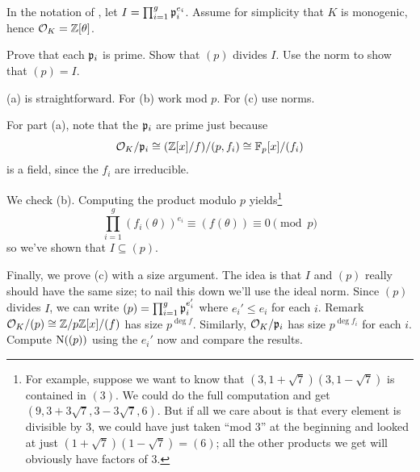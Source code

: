 \begin{problem}
	\label{prob:prove_factoring_algorithm}
	In the notation of , let $I = \prod_{i=1}^g \mathfrak p_i^{e_i}$.
	Assume for simplicity that $K$ is monogenic, hence $\mathcal O_K = \mathbb Z[\theta]$.
	\begin{enumerate}[(a)]
		\ii Prove that each $\mathfrak p_i$ is prime.
		\ii Show that $(p)$ divides $I$.
		\ii Use the norm to show that $(p) = I$.
	\end{enumerate}
	\begin{hint}
		(a) is straightforward.
		For (b) work mod $p$.
		For (c) use norms.
	\end{hint}
	\begin{sol}
	For part (a), note that the $\mathfrak p_i$ are prime
	just because
	\[ \mathcal O_K / \mathfrak p_i
		\cong (\mathbb Z[x] / f) / (p, f_i)
		\cong \mathbb F_p[x] / (f_i) \]
	is a field, since the $f_i$ are irreducible.

	We check (b).
		Computing the product modulo $p$ yields\footnote{%
			For example, suppose we want to know that $(3, 1+\sqrt{7})(3, 1-\sqrt{7})$ is contained in $(3)$.
			We could do the full computation and get $(9, 3+3\sqrt{7}, 3-3\sqrt{7}, 6)$.
			But if all we care about is that every element is divisible by $3$, we could have just taken ``mod $3$''
			at the beginning and looked at just $(1+\sqrt{7})(1-\sqrt{7}) = (6)$;
			all the other products we get will obviously have factors of $3$.
		}
		\[ \prod_{i=1}^{g} (f_i(\theta))^{e_i}
			\equiv (f(\theta)) \equiv 0 \pmod p \]
		so we've shown that $I \subseteq (p)$.

	Finally, we prove (c) with a size argument.
		The idea is that $I$ and $(p)$ really should have the same size;
		to nail this down we'll use the ideal norm.
		Since $(p)$ divides $I$, we can write
		$ (p) = \prod_{i=1}^g \mathfrak p_i^{e_i'} $
		where $e_i' \le e_i$ for each $i$.
		Remark $\mathcal O_K / (p) \cong \mathbb Z/p\mathbb Z[x] / (f)$ has size $p^{\deg f}$.
		Similarly, $\mathcal O_K / \mathfrak p_i$ has size $p^{\deg f_i}$ for each $i$.
		Compute $\operatorname{N}( (p) )$ using the $e_i'$ now and compare the results.
	\end{sol}
\end{problem}

